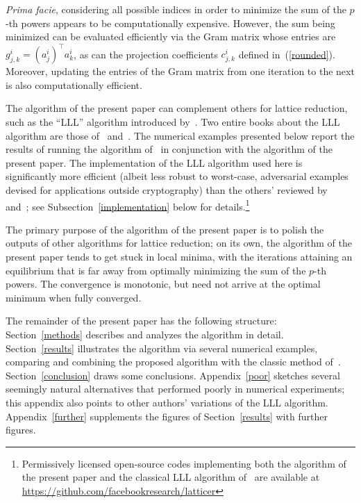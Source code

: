 \documentclass{article}
\begin{document}
{\it Prima facie}, considering all possible indices in order to minimize
the sum of the $p$-th powers appears to be computationally expensive.
However, the sum being minimized can be evaluated efficiently
via the Gram matrix whose entries are $g^i_{j,k} = (a^i_j)^\top a^i_k$,
as can the projection coefficients $c^i_{j,k}$ defined in~(\ref{rounded}).
Moreover, updating the entries of the Gram matrix from one iteration
to the next is also computationally efficient.

The algorithm of the present paper can complement others for lattice reduction,
such as the ``LLL'' algorithm introduced by~\cite{lenstra-lenstra-lovasz}.
Two entire books about the LLL algorithm are those
of~\cite{nguyen-vallee} and~\cite{bremner}.
The numerical examples presented below report the results
of running the algorithm of~\cite{lenstra-lenstra-lovasz}
in conjunction with the algorithm of the present paper.
The implementation of the LLL algorithm used here is
significantly more efficient (albeit less robust to worst-case,
adversarial examples devised for applications outside cryptography)
than the others' reviewed by~\cite{schnorr-euchner} and~\cite{stehle};
see Subsection~\ref{implementation} below
for details.\footnote{Permissively licensed open-source codes implementing
both the algorithm of the present paper and the classical LLL algorithm
of~\cite{lenstra-lenstra-lovasz} are available
at \url{https://github.com/facebookresearch/latticer}}

The primary purpose of the algorithm of the present paper is to polish
the outputs of other algorithms for lattice reduction;
on its own, the algorithm of the present paper tends to get stuck
in local minima, with the iterations attaining an equilibrium
that is far away from optimally minimizing the sum of the $p$-th powers.
The convergence is monotonic, but need not arrive at the optimal minimum
when fully converged.

The remainder of the present paper has the following structure:
Section~\ref{methods} describes and analyzes the algorithm in detail. 
Section~\ref{results} illustrates the algorithm via several numerical examples,
comparing and combining the proposed algorithm with the classic method
of~\cite{lenstra-lenstra-lovasz}.
Section~\ref{conclusion} draws some conclusions.
Appendix~\ref{poor} sketches several seemingly natural alternatives
that performed poorly in numerical experiments;
this appendix also points to other authors' variations of the LLL algorithm.
Appendix~\ref{further} supplements the figures of Section~\ref{results}
with further figures.
\end{document}
